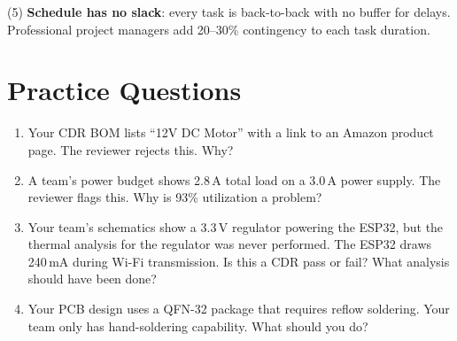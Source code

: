 (5) \textbf{Schedule has no slack}: every task is back-to-back with no buffer for delays. Professional project managers add 20--30\% contingency to each task duration.
\section{Practice Questions}
\begin{enumerate}[leftmargin=1.5em]
\item Your CDR BOM lists ``12V DC Motor'' with a link to an Amazon product page. The reviewer rejects this. Why?
\item A team's power budget shows 2.8\,A total load on a 3.0\,A power supply. The reviewer flags this. Why is 93\% utilization a problem?

\item Your team's schematics show a 3.3\,V regulator powering the ESP32, but the thermal analysis for the regulator was never performed. The ESP32 draws 240\,mA during Wi-Fi transmission. Is this a CDR pass or fail? What analysis should have been done?
\item Your PCB design uses a QFN-32 package that requires reflow soldering. Your team only has hand-soldering capability. What should you do?
\end{enumerate}


